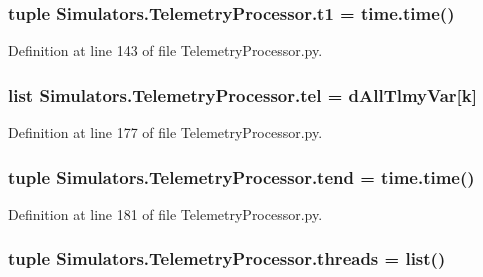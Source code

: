 \subsubsection[{t1}]{\setlength{\rightskip}{0pt plus 5cm}tuple Simulators.\+Telemetry\+Processor.\+t1 = time.\+time()}\label{namespace_simulators_1_1_telemetry_processor_a12bc7f6b923142a1a0cc282b21648fd5}


Definition at line 143 of file Telemetry\+Processor.\+py.

\hypertarget{namespace_simulators_1_1_telemetry_processor_a9e946b833e211303ea3536275fec883f}{}
\subsubsection[{tel}]{\setlength{\rightskip}{0pt plus 5cm}list Simulators.\+Telemetry\+Processor.\+tel = {\bf d\+All\+Tlmy\+Var}\mbox{[}{\bf k}\mbox{]}}\label{namespace_simulators_1_1_telemetry_processor_a9e946b833e211303ea3536275fec883f}


Definition at line 177 of file Telemetry\+Processor.\+py.

\hypertarget{namespace_simulators_1_1_telemetry_processor_ac1232c885cb32bbc1c21e374e335299b}{}
\subsubsection[{tend}]{\setlength{\rightskip}{0pt plus 5cm}tuple Simulators.\+Telemetry\+Processor.\+tend = time.\+time()}\label{namespace_simulators_1_1_telemetry_processor_ac1232c885cb32bbc1c21e374e335299b}


Definition at line 181 of file Telemetry\+Processor.\+py.

\hypertarget{namespace_simulators_1_1_telemetry_processor_a4cb7a92c4d13d088c7763dd6a5597446}{}
\subsubsection[{threads}]{\setlength{\rightskip}{0pt plus 5cm}tuple Simulators.\+Telemetry\+Processor.\+threads = list()}\label{namespace_simulators_1_1_telemetry_processor_a4cb7a92c4d13d088c7763dd6a5597446}


